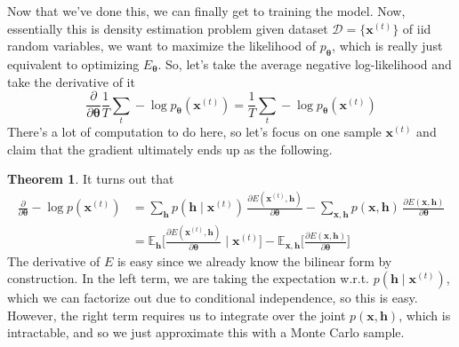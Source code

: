 \documentclass{article}
\theoremstyle{definition}
\newtheorem{theorem}{Theorem}[section]
\theoremstyle{remark}
\theoremstyle{definition}
\begin{document}
Now that we've done this, we can finally get to training the model. Now, essentially this is density estimation problem given dataset $\mathcal{D} = \{\mathbf{x}^{(t)}\}$ of iid random variables, we want to maximize the likelihood of $p_{\boldsymbol{\theta}}$, which is really just equivalent to optimizing $E_{\boldsymbol{\theta}}$. So, let's take the average negative log-likelihood and take the derivative of it
\[\frac{\partial}{\partial \boldsymbol{\theta}} \frac{1}{T} \sum_t - \log p_{\boldsymbol{\theta}} (\mathbf{x}^{(t)}) = \frac{1}{T} \sum_t - \log{p_{\boldsymbol{\theta}} (\mathbf{x}^{(t)})}\]
There's a lot of computation to do here, so let's focus on one sample $\mathbf{x}^{(t)}$ and claim that the gradient ultimately ends up as the following. 

\begin{theorem}
It turns out that
\begin{align*} 
    \frac{\partial}{\partial \boldsymbol{\theta}} - \log p(\mathbf{x}^{(t)}) & = \sum_{\mathbf{h}}  p(\mathbf{h} \mid \mathbf{x}^{(t)}) \, \frac{ \partial E(\mathbf{x}^{(t)}, \mathbf{h})}{\partial \boldsymbol{\theta}} - \sum_{\mathbf{x}, \mathbf{h}} p(\mathbf{x}, \mathbf{h}) \, \frac{\partial E(\mathbf{x}, \mathbf{h})}{\partial \boldsymbol{\theta}} \\
                                                                             & = \mathbb{E}_{\mathbf{h}} \bigg[ \frac{\partial E( \mathbf{x}^{(t)}, \mathbf{h})}{\partial \boldsymbol{\theta}} \; \bigg| \; \mathbf{x}^{(t)} \bigg] - \mathbb{E}_{\mathbf{x}, \mathbf{h}} \bigg[ \frac{\partial E(\mathbf{x}, \mathbf{h})}{\partial \boldsymbol{\theta}} \bigg]  
\end{align*}
The derivative of $E$ is easy since we already know the bilinear form by construction. In the left term, we are taking the expectation w.r.t. $p(\mathbf{h} \mid \mathbf{x}^{(t)})$, which we can factorize out due to conditional independence, so this is easy. However, the right term requires us to integrate over the joint $p(\mathbf{x}, \mathbf{h})$, which is intractable, and so we just approximate this with a Monte Carlo sample. 
\end{theorem}
\end{document}
